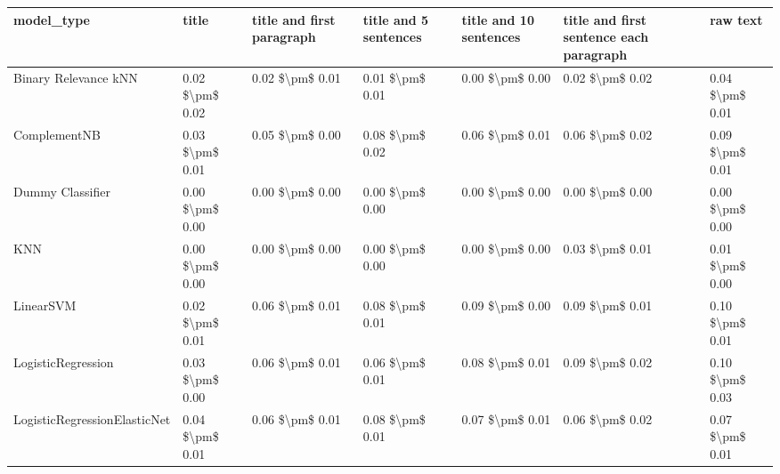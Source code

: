 \begin{tabular}{lllllll}
\toprule
                     model\_type &           title & title and first paragraph & title and 5 sentences & title and 10 sentences & title and first sentence each paragraph &            raw text \\
\midrule
           Binary Relevance kNN & 0.02 \$\textbackslash pm\$ 0.02 &           0.02 \$\textbackslash pm\$ 0.01 &       0.01 \$\textbackslash pm\$ 0.01 &        0.00 \$\textbackslash pm\$ 0.00 &                         0.02 \$\textbackslash pm\$ 0.02 &     0.04 \$\textbackslash pm\$ 0.01 \\
                   ComplementNB & 0.03 \$\textbackslash pm\$ 0.01 &           0.05 \$\textbackslash pm\$ 0.00 &       0.08 \$\textbackslash pm\$ 0.02 &        0.06 \$\textbackslash pm\$ 0.01 &                         0.06 \$\textbackslash pm\$ 0.02 &     0.09 \$\textbackslash pm\$ 0.01 \\
               Dummy Classifier & 0.00 \$\textbackslash pm\$ 0.00 &           0.00 \$\textbackslash pm\$ 0.00 &       0.00 \$\textbackslash pm\$ 0.00 &        0.00 \$\textbackslash pm\$ 0.00 &                         0.00 \$\textbackslash pm\$ 0.00 &     0.00 \$\textbackslash pm\$ 0.00 \\
                            KNN & 0.00 \$\textbackslash pm\$ 0.00 &           0.00 \$\textbackslash pm\$ 0.00 &       0.00 \$\textbackslash pm\$ 0.00 &        0.00 \$\textbackslash pm\$ 0.00 &                         0.03 \$\textbackslash pm\$ 0.01 &     0.01 \$\textbackslash pm\$ 0.00 \\
                      LinearSVM & 0.02 \$\textbackslash pm\$ 0.01 &           0.06 \$\textbackslash pm\$ 0.01 &       0.08 \$\textbackslash pm\$ 0.01 &        0.09 \$\textbackslash pm\$ 0.00 &                         0.09 \$\textbackslash pm\$ 0.01 &     0.10 \$\textbackslash pm\$ 0.01 \\
             LogisticRegression & 0.03 \$\textbackslash pm\$ 0.00 &           0.06 \$\textbackslash pm\$ 0.01 &       0.06 \$\textbackslash pm\$ 0.01 &        0.08 \$\textbackslash pm\$ 0.01 &                         0.09 \$\textbackslash pm\$ 0.02 &     0.10 \$\textbackslash pm\$ 0.03 \\
   LogisticRegressionElasticNet & 0.04 \$\textbackslash pm\$ 0.01 &           0.06 \$\textbackslash pm\$ 0.01 &       0.08 \$\textbackslash pm\$ 0.01 &        0.07 \$\textbackslash pm\$ 0.01 &                         0.06 \$\textbackslash pm\$ 0.02 &     0.07 \$\textbackslash pm\$ 0.01 \\

\end{tabular}
